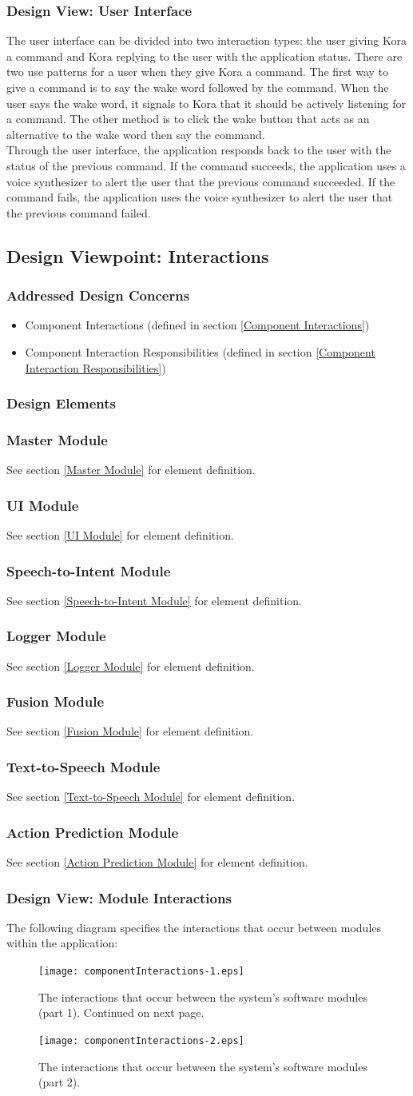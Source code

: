 \documentclass[onecolumn, draftclsnofoot,10pt, compsoc]{IEEEtran}
\newcommand{\newpara}{\\[0.1in]}
\def \botname{Kora\xspace}
\newcommand{\designConcernRef}[1]{
    #1 (defined in section \ref{#1})
}
\newcommand{\designElementRef}[1]{
    \subsubsection{#1}
        See section \ref{#1} for element definition.
}
\begin{document}
	\subsubsection{Design View: User Interface}
	The user interface can be divided into two interaction types: the user giving \botname a command and \botname replying to the user with the application status.
	There are two use patterns for a user when they give \botname a command. The first way to give a command is to say the wake word followed by the command.
	When the user says the wake word, it signals to \botname that it should be actively listening for a command.
	The other method is to click the wake button that acts as an alternative to the wake word then say the command.
	\newpara
	Through the user interface, the application responds back to the user with the status of the previous command.
	If the command succeeds, the application uses a voice synthesizer to alert the user that the previous command succeeded.
	If the command fails, the application uses the voice synthesizer to alert the user that the previous command failed.

	\subsection{Design Viewpoint: Interactions}
	\subsubsection{Addressed Design Concerns}
	\begin{itemize}
		\item \designConcernRef{Component Interactions}
		\item \designConcernRef{Component Interaction Responsibilities}
	\end{itemize}

	\subsubsection{Design Elements}
	\designElementRef{Master Module}
	\designElementRef{UI Module}
	\designElementRef{Speech-to-Intent Module}
	\designElementRef{Logger Module}
	\designElementRef{Fusion Module}
	\designElementRef{Text-to-Speech Module}
	\designElementRef{Action Prediction Module}

	\subsubsection{Design View: Module Interactions}
	The following diagram specifies the interactions that occur between modules within the application:
	\begin{figure}[H]
		\texttt{[image: componentInteractions-1.eps]}
		\centering
		\caption{The interactions that occur between the system's software modules (part 1). Continued on next page.}
		\label{fig::componentInteractions-1}
	\end{figure}
	\begin{figure}[H]
		\texttt{[image: componentInteractions-2.eps]}
		\centering
		\caption{The interactions that occur between the system's software modules (part 2).}
		\label{fig::componentInteractions-2}
	\end{figure}
\end{document}
